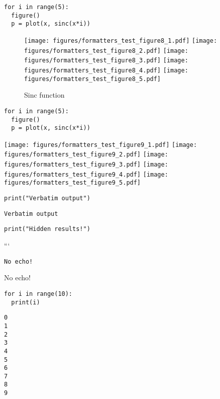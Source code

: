\begin{verbatim}
for i in range(5):
  figure()
  p = plot(x, sinc(x*i))
\end{verbatim}
\begin{sidefigure}
\begin{figure}[htpb]
\center
\texttt{[image: figures/formatters\_test\_figure8\_1.pdf]}
\texttt{[image: figures/formatters\_test\_figure8\_2.pdf]}
\texttt{[image: figures/formatters\_test\_figure8\_3.pdf]}
\texttt{[image: figures/formatters\_test\_figure8\_4.pdf]}
\texttt{[image: figures/formatters\_test\_figure8\_5.pdf]}
\caption{Sinc function}
\label{fig:None}
\end{figure}
\end{sidefigure}



\begin{verbatim}
for i in range(5):
  figure()
  p = plot(x, sinc(x*i))
\end{verbatim}
\texttt{[image: figures/formatters\_test\_figure9\_1.pdf]}
\texttt{[image: figures/formatters\_test\_figure9\_2.pdf]}
\texttt{[image: figures/formatters\_test\_figure9\_3.pdf]}
\texttt{[image: figures/formatters\_test\_figure9\_4.pdf]}
\texttt{[image: figures/formatters\_test\_figure9\_5.pdf]}



\begin{verbatim}
print("Verbatim output")
\end{verbatim}
\begin{verbatim}
Verbatim output
\end{verbatim}



\begin{verbatim}
print("Hidden results!")
\end{verbatim}


```


\begin{verbatim}
No echo!
\end{verbatim}




No echo!



\begin{verbatim}
for i in range(10):
  print(i)
\end{verbatim}
\begin{verbatim}
0
1
2
3
4
5
6
7
8
9
\end{verbatim}



